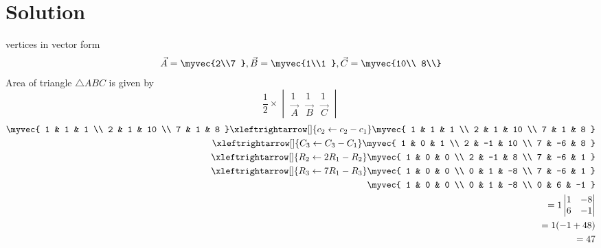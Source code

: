 \documentclass[journal,12pt,twocolumn]{IEEEtran}
\begin{document}
\section{Solution}
vertices in vector form
\begin{align}
\vec{A} = \myvec{2\\7 },
\vec{B} = \myvec{1\\1 },
\vec{C} = \myvec{10\\ 8\\}
\end{align}
Area of triangle $\triangle ABC$  is given by 
\begin{equation}\label{equation}
\frac{1}{2}  \times 
\begin{vmatrix} 1 & 1 & 1 \\ \vec{A}  & \vec{B} &  \vec{C}  \end{vmatrix}
\end{equation}
\begin{align}
     \label{eq}
\myvec{
1 & 1 & 1 
\\
2 & 1 & 10 
\\
7 & 1 & 8 
}
 \xleftrightarrow[]{c_2 \leftarrow c_2-c_1}
\myvec{
1 & 1 & 1
\\
2 & 1 & 10
\\
7 & 1 & 8
}
\\
 \xleftrightarrow[]{C_3\leftarrow C_3-C_1}
\myvec{
1 & 0 & 1
\\
2 & -1 & 10
\\
7 & -6 & 8
}
\\
 \xleftrightarrow[]{R_2\leftarrow 2R_1-R_2}
\myvec{
1 & 0 & 0
\\
2 & -1 & 8 
\\
7 & -6 & 1 
}
\\
 \xleftrightarrow[]{R_3\leftarrow 7R_1-R_3}
\myvec{
1 & 0 & 0
\\
0 & 1 & -8
\\
7 & -6 & 1 
}\\
\myvec{
1 & 0 & 0
\\
0 & 1 & -8
\\
0 & 6 & -1 
}\\
=1\begin{vmatrix}
1 & -8 \\6 & -1
\end{vmatrix}\\
= 1(-1+48)\\
= 47
\end{align}
\end{document}
